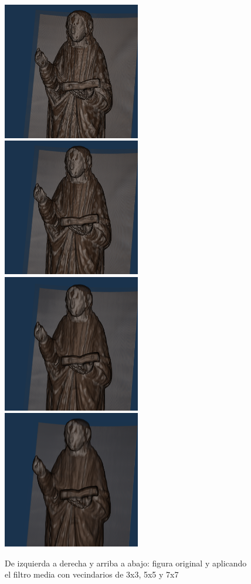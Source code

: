 \begin{figure}[H]
	\centering
	\includegraphics[width=6cm]{imagenes/resultados/filtrado/original}
	\includegraphics[width=6cm]{imagenes/resultados/filtrado/media-3}
	\includegraphics[width=6cm]{imagenes/resultados/filtrado/media-5}
	\includegraphics[width=6cm]{imagenes/resultados/filtrado/media-7}
	\caption{De izquierda a derecha y arriba a abajo: figura original y aplicando el filtro media con vecindarios de 3x3, 5x5 y 7x7}
	\label{fig:resultados/filtrado/media}
\end{figure}

